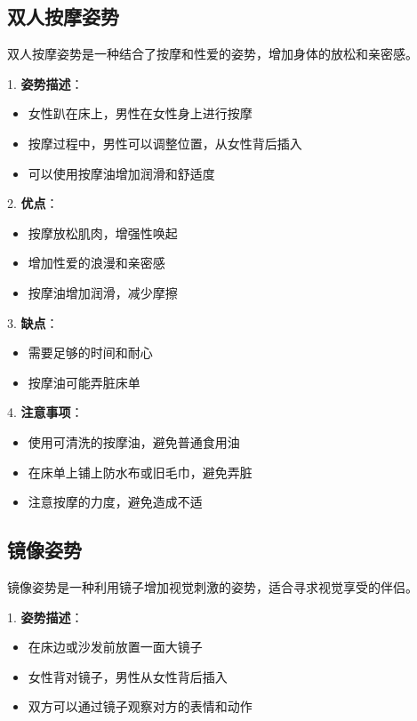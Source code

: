 \documentclass[12pt,UTF8]{ctexbook}
\begin{document}
\subsection{双人按摩姿势}

双人按摩姿势是一种结合了按摩和性爱的姿势，增加身体的放松和亲密感。

1. \textbf{姿势描述}：
  \begin{itemize}
  \item 女性趴在床上，男性在女性身上进行按摩
  \item 按摩过程中，男性可以调整位置，从女性背后插入
  \item 可以使用按摩油增加润滑和舒适度
  \end{itemize}

2. \textbf{优点}：
  \begin{itemize}
  \item 按摩放松肌肉，增强性唤起
  \item 增加性爱的浪漫和亲密感
  \item 按摩油增加润滑，减少摩擦
  \end{itemize}

3. \textbf{缺点}：
  \begin{itemize}
  \item 需要足够的时间和耐心
  \item 按摩油可能弄脏床单
  \end{itemize}

4. \textbf{注意事项}：
  \begin{itemize}
  \item 使用可清洗的按摩油，避免普通食用油
  \item 在床单上铺上防水布或旧毛巾，避免弄脏
  \item 注意按摩的力度，避免造成不适
  \end{itemize}

\subsection{镜像姿势}

镜像姿势是一种利用镜子增加视觉刺激的姿势，适合寻求视觉享受的伴侣。

1. \textbf{姿势描述}：
  \begin{itemize}
  \item 在床边或沙发前放置一面大镜子
  \item 女性背对镜子，男性从女性背后插入
  \item 双方可以通过镜子观察对方的表情和动作
  \end{itemize}
\end{document}
